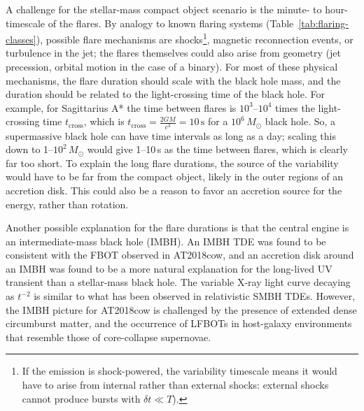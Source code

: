 \documentclass{nature_plusfigure}
\begin{document}
\begin{methods}
A challenge for the stellar-mass compact object scenario is the minute- to hour-timescale of the flares. By analogy to known flaring systems (Table~\ref{tab:flaring-classes}), possible flare mechanisms are shocks\footnote{If the emission is shock-powered, the variability timescale means it would have to arise from internal rather than external shocks: external shocks cannot\cite{Kumar2015} produce bursts with $\delta t\ll T$).
}, magnetic reconnection events, or turbulence in the jet; the flares themselves could also arise from geometry (jet precession, orbital motion in the case of a binary). For most of these physical mechanisms, the flare duration should scale with the black hole mass, and the duration should be related to the light-crossing time of the black hole. 
For example, for Sagittarius A* the time between flares is $10^{3}$--$10^{4}$ times the light-crossing time $t_\mathrm{cross}$, which is $t_\mathrm{cross}=\frac{2GM}{c^3}=10\,\mathrm{s}$ for a $10^6\,M_\odot$ black hole.
So, a supermassive black hole can have time intervals as long as a day; scaling this down to 1--$10^2\,M_\odot$ would give 1--10\,s as the time between flares, which is clearly far too short.
To explain the long flare durations, the source of the variability would have to be far from the compact object, likely in the outer regions of an accretion disk\cite{Metzger2022}. This could also be a reason to favor an accretion source for the energy, rather than rotation.

Another possible explanation for the flare durations is that the central engine is an intermediate-mass black hole (IMBH). An IMBH TDE was found to be consistent with the FBOT observed in AT2018cow\cite{Kuin2019,Perley2019}, and an accretion disk around an IMBH was found to be a more natural explanation for the long-lived UV transient than a stellar-mass black hole\cite{Chen2023}. The variable X-ray light curve decaying as $t^{-2}$ is similar to what has been observed in relativistic SMBH TDEs. However, the IMBH picture for AT2018cow is challenged\cite{Margutti2019,Metzger2022} by the presence of extended dense circumburst matter\cite{Ho2019,Nayana2021}, and the occurrence of LFBOTs in host-galaxy environments that resemble those of core-collapse supernovae\cite{Lyman2020}. 


\end{methods}
\end{document}
